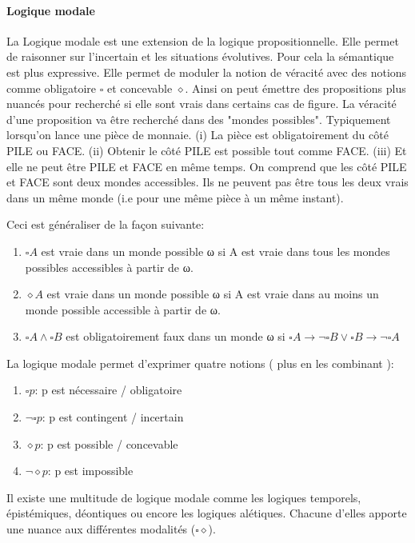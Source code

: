 \begin{refsegment}
    \paragraph{Logique modale}
    La Logique modale est une extension de la logique propositionnelle. Elle permet de raisonner sur l'incertain et les situations évolutives. Pour cela la sémantique est plus expressive. Elle permet de moduler la notion de véracité avec des notions comme obligatoire $\square$ et concevable $\diamond$. Ainsi on peut émettre des propositions plus nuancés pour recherché si elle sont vrais dans certains cas de figure. La véracité d'une proposition va être recherché dans des "mondes possibles". Typiquement lorsqu'on lance une pièce de monnaie. (i) La pièce est obligatoirement du côté PILE ou FACE. (ii) Obtenir le côté PILE est possible tout comme FACE. (iii) Et elle ne peut être PILE et FACE en même temps. On comprend que les côté PILE et FACE sont deux mondes accessibles. Ils ne peuvent pas être tous les deux vrais dans un même monde (i.e pour une même pièce à un même instant).
    
    Ceci est généraliser de la façon suivante:\nolisttopbreak
    \begin{enumerate}[label=\roman*)]
        \item $\square A$ est vraie dans un monde possible ω si A est vraie dans tous les mondes possibles accessibles à partir de ω.
        \item $\diamond A$ est vraie dans un monde possible ω si A est vraie dans au moins un monde possible accessible à partir de ω.
        \item $\square A \land \square B$ est obligatoirement faux dans un monde ω si $\square A \to \lnot \square B \lor \square B \to \lnot\square A$
    \end{enumerate}

    La logique modale permet d'exprimer quatre notions ( plus en les combinant ):\nolisttopbreak
    \begin{enumerate}[label={}]
        \item $\square p$: p est nécessaire / obligatoire
        \item $\lnot\square p$: p est contingent / incertain
        \item $\diamond p$: p est possible / concevable
        \item $\lnot \diamond p$: p est impossible
    \end{enumerate}

    Il existe une multitude de logique modale comme les logiques temporels, épistémiques, déontiques ou encore les logiques alétiques. Chacune d'elles apporte une nuance aux différentes modalités ($\square \diamond$).
    

\end{refsegment}
